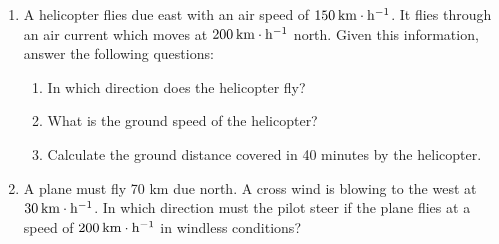         
        \label{m38819*id198154}\begin{enumerate}[noitemsep, label=\textbf{\arabic*}. ] 
            \label{m38819*uid118}\item A helicopter flies due east with an air speed of \begin{math}150\phantom{\rule{2pt}{0ex}}\mathrm{km}\ensuremath{\cdot}\mathrm{h}{}^{-1}\end{math}. It flies through an air current which moves at \begin{math}200\phantom{\rule{2pt}{0ex}}\mathrm{km}\ensuremath{\cdot}\mathrm{h}{}^{-1}\end{math} north. Given this information, answer the following questions:
\label{m38819*id198203}\begin{enumerate}[noitemsep, label=\textbf{\alph*}. ] 
            \label{m38819*uid119}\item In which direction does the helicopter fly?
\label{m38819*uid120}\item What is the ground speed of the helicopter?
\label{m38819*uid121}\item Calculate the ground distance covered in 40 minutes by the helicopter.
\end{enumerate}
                \label{m38819*uid122}\item A plane must fly 70 km due north. A cross wind is blowing to the west at \begin{math}30\phantom{\rule{2pt}{0ex}}\mathrm{km}\ensuremath{\cdot}\mathrm{h}{}^{-1}\end{math}. In which direction must the pilot steer if the plane flies at a speed of \begin{math}200\phantom{\rule{2pt}{0ex}}\mathrm{km}\ensuremath{\cdot}\mathrm{h}{}^{-1}\end{math} in windless conditions?\newline
            

\end{enumerate}
